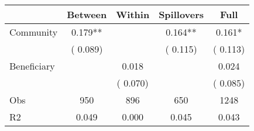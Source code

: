 
\begin{tabular}{l*{4}{c}}\hline&\multicolumn{1}{c}{Between}&\multicolumn{1}{c}{Within}&\multicolumn{1}{c}{Spillovers}&\multicolumn{1}{c}{Full}\\ \hline
 Community             &              0.179**      &                                               &        0.164** &         0.161*                            \\ 
                               &        (       0.089)           &                                       &       (       0.115)     &      (       0.113)                                           \\ 
 Beneficiary   &                                               &        0.018    &                                &             0.024                            \\ 
                               &                                               & (       0.070)                  &                                        &      (       0.085)                                           \\ 
\hline                                                                                                                                                                                                                                            
 Obs                   &               950               &       896                       &       650                &              1248                                               \\ 
 R2                    &                      0.049              &              0.000                      &              0.045               &                     0.043                                              \\ 
\hline \end{tabular}                                                                                                                                                                                                              